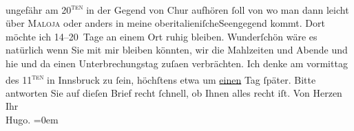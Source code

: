 \begin{ledgroupsized}[t]{13cm}
                    ungefähr am 20\textsuperscript{\textsc{ten}} in der Gegend von Chur aufhören ſoll
                    von wo man dann leicht über \textsc{Maloja} oder anders {\pb}in meine oberitalieniſcheSeengegend kommt. Dort möchte ich 14–20 Tage an einem Ort ruhig bleiben.
                    Wunderſchön wäre es natürlich wenn Sie mit mir bleiben könnten, wir die
                    Mahlzeiten und Abende und hie und da einen Unterbrechungstag {\pb}zuſa{\geminationm}en verbrächten.\pend
           \pstart
           Ich denke am vormittag des 11\textsuperscript{\textsc{ten}} in Innsbruck zu ſein, höchſtens etwa um
                        \uline{einen} Tag ſpäter. Bitte antworten Sie auf
                    dieſen Brief recht ſchnell, ob Ihnen alles recht iſt.\pend
           \pstart
           Von Herzen Ihr{\\[\baselineskip]}\spacefill\mbox{Hugo.}\pend
           \leftskip=0em{}\endnumbering{}\end{ledgroupsized}  \newcommand{\dateiname}{L00829}\newcommand{\titel}{Hugo von Hofmannsthal an Arthur Schnitzler, 3. 8. [1898]}\newcommand{\editorInnen}{Martin Anton Müller und Gerd-Hermann Susen}
      